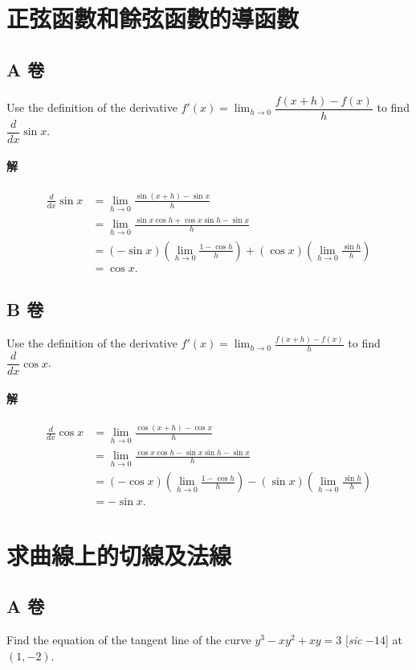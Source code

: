\documentclass[a4paper,12pt]{article}
\begin{document}
\begin{CJK}{UTF8}{bsmi}
\section{正弦函數和餘弦函數的導函數}
\subsection{A 卷}
Use the definition of the derivative $\displaystyle f'(x)=\lim_{h\to0}\dfrac{f(x+h)-f(x)}{h}$ to find $\dfrac{d}{dx}\sin x$.

\paragraph{解}
\begin{align*}
\frac{d}{dx}\sin x &= \lim_{h\to0}\frac{\sin(x+h) - \sin x}{h}\\
&= \lim_{h\to0}\frac{\sin x \cos h + \cos x \sin h - \sin x}{h}\\
&= (-\sin x)\left(\lim_{h\to0}\frac{1-\cos h}{h}\right) + (\cos x)\left(\lim_{h\to0}\frac{\sin h}{h}\right)\\
&= \cos x.
\end{align*}

\subsection{B 卷}
Use the definition of the derivative $\displaystyle f'(x)=\lim_{h\to0}\frac{f(x+h)-f(x)}{h}$ to find $\dfrac{d}{dx}\cos x$.

\paragraph{解}
\begin{align*}
\frac{d}{dx}\cos x &= \lim_{h\to0}\frac{\cos(x+h) - \cos x}{h}\\
&= \lim_{h\to0}\frac{\cos x \cos h - \sin x \sin h - \sin x}{h}\\
&= (-\cos x)\left(\lim_{h\to0}\frac{1-\cos h}{h}\right) - (\sin x)\left(\lim_{h\to0}\frac{\sin h}{h}\right)\\
&= -\sin x.
\end{align*}

\section{求曲線上的切線及法線}
\subsection{A 卷}
Find the equation of the tangent line of the curve $y^3 - xy^2 + xy = 3$ [\textit{sic} $-14$] at $(1,-2)$.

\end{CJK}
\end{document}
